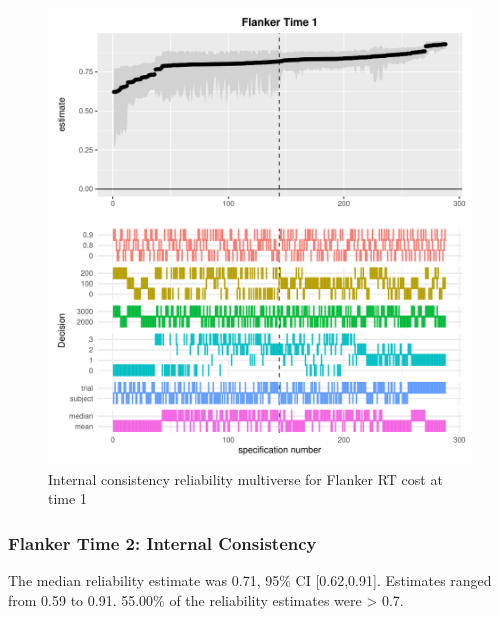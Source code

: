 \documentclass[
  man,floatsintext]{apa6}
\begin{document}
\begin{figure}
\centering
\includegraphics{Reliability_Multiverse_files/figure-latex/unnamed-chunk-8-1.pdf}
\caption{\label{fig:unnamed-chunk-8}Internal consistency reliability multiverse for Flanker RT cost at time 1}
\end{figure}

\newpage

\hypertarget{flanker-time-2-internal-consistency}{%
\subsubsection{Flanker Time 2: Internal Consistency}\label{flanker-time-2-internal-consistency}}

The median reliability estimate was 0.71, 95\% CI {[}0.62,0.91{]}. Estimates ranged from 0.59 to 0.91. 55.00\% of the reliability estimates were \textgreater{} 0.7.
\end{document}
